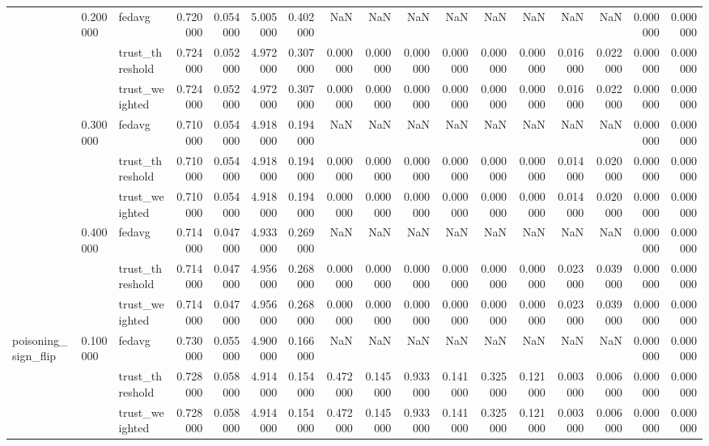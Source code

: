 \begin{tabular}{lllrrrrrrrrrrrrrr}
\cline{2-17}
 & \multirow[t]{3}{*}{0.200000} & fedavg & 0.720000 & 0.054000 & 5.005000 & 0.402000 & NaN & NaN & NaN & NaN & NaN & NaN & NaN & NaN & 0.000000 & 0.000000 \\
 &  & trust_threshold & 0.724000 & 0.052000 & 4.972000 & 0.307000 & 0.000000 & 0.000000 & 0.000000 & 0.000000 & 0.000000 & 0.000000 & 0.016000 & 0.022000 & 0.000000 & 0.000000 \\
 &  & trust_weighted & 0.724000 & 0.052000 & 4.972000 & 0.307000 & 0.000000 & 0.000000 & 0.000000 & 0.000000 & 0.000000 & 0.000000 & 0.016000 & 0.022000 & 0.000000 & 0.000000 \\
\cline{2-17}
 & \multirow[t]{3}{*}{0.300000} & fedavg & 0.710000 & 0.054000 & 4.918000 & 0.194000 & NaN & NaN & NaN & NaN & NaN & NaN & NaN & NaN & 0.000000 & 0.000000 \\
 &  & trust_threshold & 0.710000 & 0.054000 & 4.918000 & 0.194000 & 0.000000 & 0.000000 & 0.000000 & 0.000000 & 0.000000 & 0.000000 & 0.014000 & 0.020000 & 0.000000 & 0.000000 \\
 &  & trust_weighted & 0.710000 & 0.054000 & 4.918000 & 0.194000 & 0.000000 & 0.000000 & 0.000000 & 0.000000 & 0.000000 & 0.000000 & 0.014000 & 0.020000 & 0.000000 & 0.000000 \\
\cline{2-17}
 & \multirow[t]{3}{*}{0.400000} & fedavg & 0.714000 & 0.047000 & 4.933000 & 0.269000 & NaN & NaN & NaN & NaN & NaN & NaN & NaN & NaN & 0.000000 & 0.000000 \\
 &  & trust_threshold & 0.714000 & 0.047000 & 4.956000 & 0.268000 & 0.000000 & 0.000000 & 0.000000 & 0.000000 & 0.000000 & 0.000000 & 0.023000 & 0.039000 & 0.000000 & 0.000000 \\
 &  & trust_weighted & 0.714000 & 0.047000 & 4.956000 & 0.268000 & 0.000000 & 0.000000 & 0.000000 & 0.000000 & 0.000000 & 0.000000 & 0.023000 & 0.039000 & 0.000000 & 0.000000 \\
\cline{1-17} \cline{2-17}
\multirow[t]{12}{*}{poisoning_sign_flip} & \multirow[t]{3}{*}{0.100000} & fedavg & 0.730000 & 0.055000 & 4.900000 & 0.166000 & NaN & NaN & NaN & NaN & NaN & NaN & NaN & NaN & 0.000000 & 0.000000 \\
 &  & trust_threshold & 0.728000 & 0.058000 & 4.914000 & 0.154000 & 0.472000 & 0.145000 & 0.933000 & 0.141000 & 0.325000 & 0.121000 & 0.003000 & 0.006000 & 0.000000 & 0.000000 \\
 &  & trust_weighted & 0.728000 & 0.058000 & 4.914000 & 0.154000 & 0.472000 & 0.145000 & 0.933000 & 0.141000 & 0.325000 & 0.121000 & 0.003000 & 0.006000 & 0.000000 & 0.000000 \\

\end{tabular}
